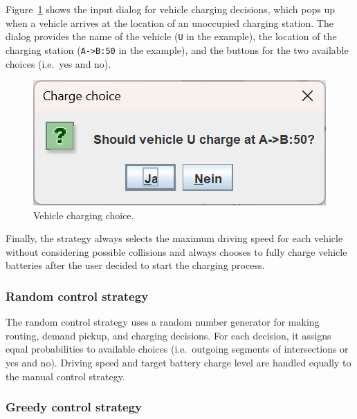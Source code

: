 \documentclass[a4paper,twoside]{article}
\begin{document}
	Figure~\ref{fig:manual-controller-charge} shows the input dialog for vehicle charging decisions, which pops up when a vehicle arrives at the location of an unoccupied charging station.
	The dialog provides the name of the vehicle (\texttt{U} in the example), the location of the charging station (\texttt{A->B:50} in the example), and the buttons for the two available choices (i.e.\ yes and no).
	\begin{figure}[!ht]
		\centering
		\includegraphics[scale=0.3]{../../screenshots/manual-controller-charge.png}
		\caption{Vehicle charging choice.}
		\label{fig:manual-controller-charge}
	\end{figure}
	Finally, the strategy always selects the maximum driving speed for each vehicle without considering possible collisions and always chooses to fully charge vehicle batteries after the user decided to start the charging process.
	
	\subsubsection*{Random control strategy}
	\label{sec:controller-random}
	
	The random control strategy uses a random number generator for making routing, demand pickup, and charging decisions.
	For each decision, it assigns equal probabilities to available choices (i.e.\ outgoing segments of intersections or yes and no).
	Driving speed and target battery charge level are handled equally to the manual control strategy.
	
	\subsubsection*{Greedy control strategy}
	\label{sec:controller-greedy}
	
\end{document}
